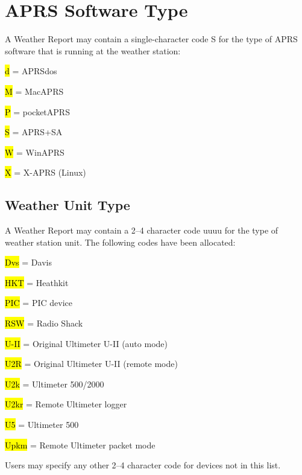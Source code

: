 \section {APRS Software Type}

A Weather Report may contain a single-character code S for the type of
APRS software that is running at the weather station:


\begin{description}
\item \hl{d} = APRSdos
\item \hl{M} = MacAPRS
\item \hl{P} = pocketAPRS
\item \hl{S} = APRS+SA
\item \hl{W} = WinAPRS
\item \hl{X} = X-APRS (Linux)
\end{description}

\subsection {Weather Unit Type}

A Weather Report may contain a 2–4 character code uuuu for the type of
weather station unit. The following codes have been allocated:

\begin{description}
\item \hl{Dvs} = Davis
\item \hl{HKT} = Heathkit
\item \hl{PIC} = PIC device
\item \hl{RSW} = Radio Shack
\item \hl{U-II} = Original Ultimeter U-II (auto mode)
\item \hl{U2R} = Original Ultimeter U-II (remote mode)
\item \hl{U2k} = Ultimeter 500/2000
\item \hl{U2kr} = Remote Ultimeter logger
\item \hl{U5} = Ultimeter 500
\item \hl{Upkm} = Remote Ultimeter packet mode
\end{description}

  Users may specify any other 2–4 character code for devices not in this list.



